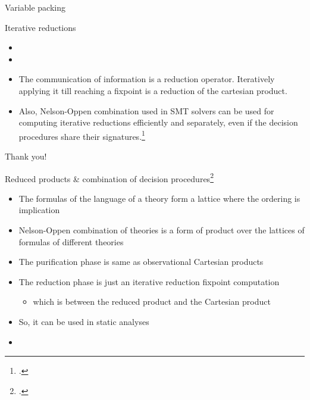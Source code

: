 \documentclass[aspectratio=169]{beamer}
\begin{document}
\begin{frame}{Variable packing}
\end{frame}

\begin{frame}{Iterative reductions}
  \small
  \begin{itemize}
  \item {}
  \item {}
  \item The communication of information is a reduction operator. Iteratively applying it till reaching a fixpoint is a reduction of the cartesian product.
  \item Also, Nelson-Oppen combination used in SMT solvers can be used for computing iterative reductions efficiently and separately, even if the decision procedures share their signatures.\footcite{cousot2011reduced}
  \end{itemize}
\end{frame}

\begin{frame}[standout]
  Thank you!
\end{frame}

\appendix

\begin{frame}{Reduced products \& combination of decision procedures\footcite{cousot2011reduced}}
  \footnotesize
  \begin{itemize}
  \item The formulas of the language of a theory form a lattice where the ordering is implication
  \item Nelson-Oppen combination of theories is a form of product over the lattices of formulas of different theories
  \item The purification phase is same as observational Cartesian products
  \item The reduction phase is just an iterative reduction fixpoint computation
    \begin{itemize}
    \item which is between the reduced product and the Cartesian product
    \end{itemize}
  \item So, it can be used in static analyses
  \item {}
  \end{itemize}
\end{frame}
\end{document}
